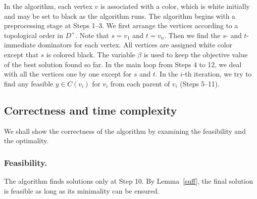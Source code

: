In the algorithm, each vertex $v$ is associated with a color, which is white initially and may be set to black as the algorithm runs.
The algorithm begins with a preprocessing stage at Steps 1--3.
We first arrange the vertices according to a topological order in $D^+$.
Note that $s=v_1$ and $t=v_n$.
Then we find the $s$- and $t$-immediate dominators for each vertex.
All vertices are assigned white color except that $s$ is colored black.
The variable $\beta$ is used to keep the objective value of the best solution found so far.
In the main loop from Steps 4 to 12, we deal with all the vertices one by one except for $s$ and $t$. 
In the $i$-th iteration, we try to find any feasible $y\in C(v_i)$ for $v_i$ from each parent of $v_i$ (Steps 5--11).

\subsection{Correctness and time complexity}
We shall show the correctness of the algorithm by examining the feasibility and the optimality.
\subsubsection*{Feasibility.}
The algorithm finds solutions only at Step 10. By Lemma~\ref{suff}, the final solution is feasible as long as its minimality can be ensured. 

